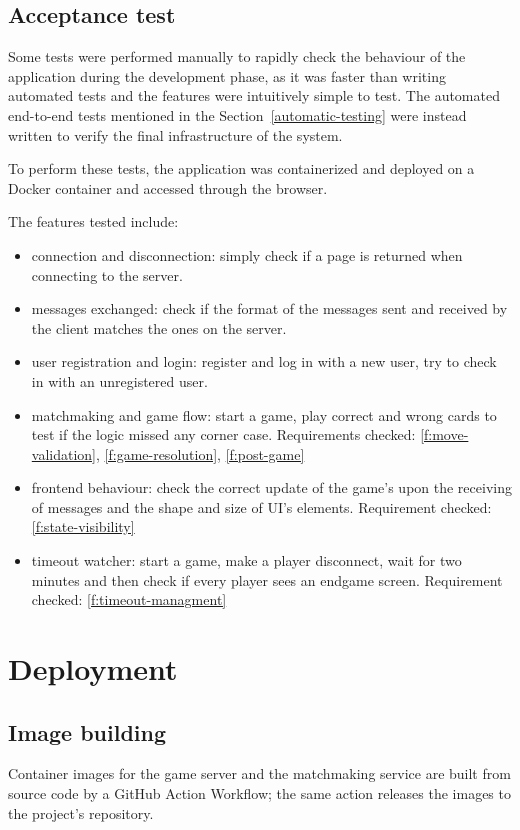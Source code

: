 \documentclass{scrartcl}
\begin{document}
\subsection{Acceptance test}\label{acceptance-test}
Some tests were performed manually to rapidly check the behaviour of the application during the
development phase, as it was faster than writing automated tests and the features were intuitively simple to test.
The automated end-to-end tests mentioned in the Section~\ref{automatic-testing} were instead written to verify the final
infrastructure of the system.

To perform these tests, the application was containerized and deployed on a Docker container
and accessed through the browser.

The features tested include:
\begin{itemize}
  \item connection and disconnection: simply check if a page is returned when connecting to the server.
  \item messages exchanged: check if the format of the messages sent and received by the client matches the ones on the server.
  \item user registration and login: register and log in with a new user, try to check in with an unregistered user.
  \item matchmaking and game flow: start a game, play correct and wrong cards to test if the logic missed any corner case. Requirements checked: \ref{f:move-validation}, \ref{f:game-resolution}, \ref{f:post-game}
  \item frontend behaviour: check the correct update of the game's upon the receiving of messages and the shape and size of UI's elements. Requirement checked: \ref{f:state-visibility}
  \item timeout watcher: start a game, make a player disconnect, wait for two minutes and then check if every player sees an endgame screen. Requirement checked: \ref{f:timeout-managment}
\end{itemize}

\section{Deployment}\label{deployment}
\subsection{Image building}
Container images for the game server and the matchmaking service are built from
source code by a GitHub Action Workflow; the same action releases the images to
the project's repository.
\end{document}

